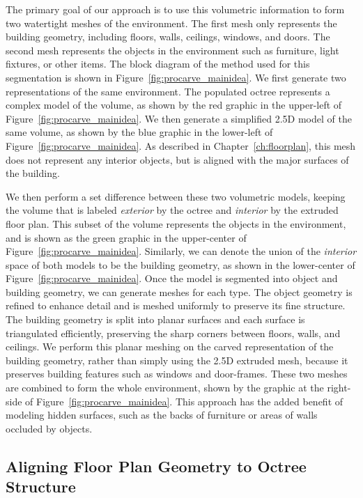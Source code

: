 \documentclass[12pt,onecolumn,oneside]{book}
\begin{document}
The primary goal of our approach is to use this volumetric information to form two watertight meshes of the environment.  The first mesh only represents the building geometry, including floors, walls, ceilings, windows, and doors.  The second mesh represents the objects in the environment such as furniture, light fixtures, or other items.  The block diagram of the method used for this segmentation is shown in Figure~\ref{fig:procarve_mainidea}.  We first generate two representations of the same environment.  The populated octree represents a complex model of the volume, as shown by the red graphic in the upper-left of Figure~\ref{fig:procarve_mainidea}.  We then generate a simplified 2.5D model of the same volume, as shown by the blue graphic in the lower-left of Figure~\ref{fig:procarve_mainidea}.  As described in Chapter~\ref{ch:floorplan}, this mesh does not represent any interior objects, but is aligned with the major surfaces of the building.

We then perform a set difference between these two volumetric models, keeping the volume that is labeled {\it exterior} by the octree and {\it interior} by the extruded floor plan.  This subset of the volume represents the objects in the environment, and is shown as the green graphic in the upper-center of Figure~\ref{fig:procarve_mainidea}.  Similarly, we can denote the union of the {\it interior} space of both models to be the building geometry, as shown in the lower-center of Figure~\ref{fig:procarve_mainidea}.  Once the model is segmented into object and building geometry, we can generate meshes for each type.  The object geometry is refined to enhance detail and is meshed uniformly to preserve its fine structure.  The building geometry is split into planar surfaces and each surface is triangulated efficiently, preserving the sharp corners between floors, walls, and ceilings.  We perform this planar meshing on the carved representation of the building geometry, rather than simply using the 2.5D extruded mesh, because it preserves building features such as windows and door-frames.  These two meshes are combined to form the whole environment, shown by the graphic at the right-side of Figure~\ref{fig:procarve_mainidea}.  This approach has the added benefit of modeling hidden surfaces, such as the backs of furniture or areas of walls occluded by objects.

\subsection{Aligning Floor Plan Geometry to Octree Structure}
\label{ssec:procarve_fp_alignment}
\end{document}
